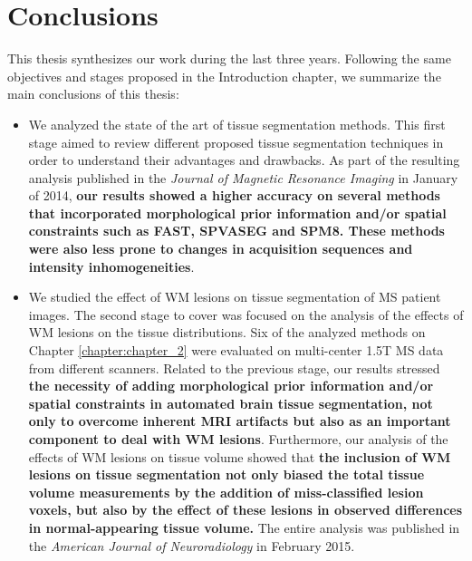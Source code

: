 
\chapter{Conclusions}

This thesis synthesizes our work during the last three years. Following the same objectives and stages proposed in the Introduction chapter, we summarize the main conclusions of this thesis: 

\begin{itemize}

\item We analyzed the state of the art of tissue segmentation methods. This first stage aimed to review different proposed tissue segmentation techniques in order to understand their advantages and drawbacks. As part of the resulting analysis published in the\textit{ Journal of Magnetic Resonance Imaging} in January of 2014,  
\textbf{our results showed a higher accuracy on several methods that incorporated morphological prior information and/or spatial constraints such as FAST, SPVASEG and SPM8. These methods were also less prone to changes in acquisition sequences and intensity inhomogeneities}.

\item We studied the effect of WM lesions on tissue segmentation of MS patient images. The second stage to cover was focused on the analysis of the effects of WM lesions on the tissue distributions. Six of the analyzed methods on Chapter \ref{chapter:chapter_2} were evaluated on multi-center 1.5T MS data from different scanners. 
Related to the previous stage, our results stressed \textbf{the necessity of adding morphological prior information and/or spatial constraints in automated brain tissue
segmentation, not only to overcome inherent MRI artifacts but also as an important component to deal with WM lesions}. Furthermore, our analysis of the effects of WM lesions on tissue volume showed that \textbf{the inclusion of WM lesions on tissue segmentation not only biased the total tissue volume measurements by the addition of miss-classified lesion voxels, but also by the effect of these lesions in observed differences in normal-appearing tissue volume.} The entire analysis was published in the \textit{American Journal of Neuroradiology} in February 2015.


\end{itemize}
